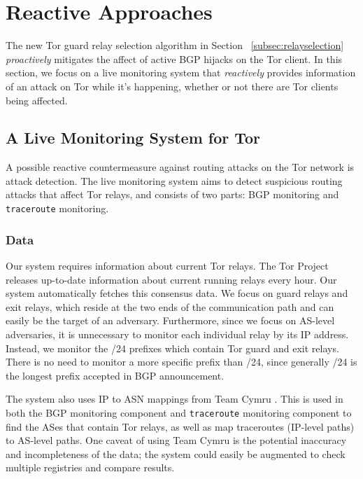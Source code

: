 \section{Reactive Approaches}
The new Tor guard relay selection algorithm in Section ~\ref{subsec:relayselection} \emph{proactively} mitigates the affect of active BGP hijacks on the Tor client. In this section, we focus on a live monitoring system that \emph{reactively} provides information of an attack on Tor while it's happening, whether or not there are Tor clients being affected. 

\subsection{A Live Monitoring System for Tor}
A possible reactive countermeasure against routing attacks on the Tor network is attack 
detection.  The live monitoring system aims to detect suspicious routing attacks that affect Tor relays, and consists of two parts: BGP monitoring and {\tt traceroute} monitoring.\\

\subsubsection{Data} 
\label{sec:data}
Our system requires information about current Tor relays.  The Tor Project releases up-to-date information about current running relays every hour. Our system automatically fetches this consensus data. We focus on guard relays and exit relays, which reside at the two ends of the communication path and can easily be the target of an adversary. Furthermore, since we focus on AS-level adversaries, it is unnecessary to monitor each individual relay by its IP address. Instead, we monitor the /24 prefixes which contain Tor guard and exit relays. There is no need to monitor a more specific prefix than /24, since generally /24 is the longest prefix accepted in BGP announcement.

The system also uses IP to ASN mappings from Team Cymru \cite{teamcymru}.  This is used in both the BGP monitoring component and {\tt traceroute} monitoring component to find the ASes that contain Tor relays, as well as map traceroutes (IP-level paths) to AS-level paths.  One caveat of using Team Cymru is the potential inaccuracy and incompleteness of the data; the system could easily be augmented to check multiple registries and compare results.

